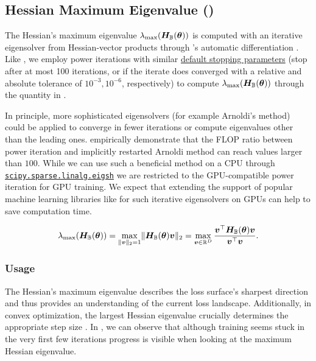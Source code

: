 \subsection{Hessian Maximum Eigenvalue
  ()}\label{cockpit::app:max-ev}

The Hessian's maximum eigenvalue $\lambda_{\text{max}}({\bm{H}}_{{\mathbb{B}}}({\bm{\theta}}))$ is
computed with an iterative eigensolver from Hessian-vector products through
\pytorch's automatic differentiation \citep{pearlmutter1994fast}. Like
\citet{yao2020pyhessian}, we employ power iterations with similar
\href{https://github.com/amirgholami/PyHessian/blob/0f7e0f63a0f132998608013351ba19955fc9d861/pyhessian/hessian.py#L111-L158}{default
  stopping parameters} (stop after at most 100 iterations, or if the iterate
does converged with a relative and absolute tolerance of $10^{-3}, 10^{-6}$,
respectively) to compute $\lambda_{\text{max}}({\bm{H}}_{{\mathbb{B}}}({\bm{\theta}}))$ through the
 quantity in \cockpit.

In principle, more sophisticated eigensolvers (for example Arnoldi's method)
could be applied to converge in fewer iterations or compute eigenvalues other
than the leading ones. \citet{warsa2004krylov} empirically demonstrate that the
FLOP ratio between power iteration and implicitly restarted Arnoldi method can
reach values larger than $100$. While we can use such a beneficial method on a
CPU through
\href{https://docs.scipy.org/doc/scipy/reference/generated/scipy.sparse.linalg.eigsh.html} {\texttt{scipy.sparse.linalg.eigsh}}
we are restricted to the GPU-compatible power iteration for GPU training. We
expect that extending the support of popular machine learning libraries like
\pytorch for such iterative eigensolvers on GPUs can help to save computation
time.

\begin{equation}
  \label{cockpit::eq:hess-max-ev-feature-table}
  \lambda_{\text{max}}({\bm{H}}_{{\mathbb{B}}}({\bm{\theta}}))
  =
  \max_{\lVert {\bm{v}} \rVert_2 = 1} \lVert {\bm{H}}_{{\mathbb{B}}}({\bm{\theta}}){\bm{v}} \rVert_2
  =
  \max_{{\bm{v}} \in {\mathbb{R}}^D} \frac{{\bm{v}}^\top {\bm{H}}_{{\mathbb{B}}}({\bm{\theta}}) {\bm{v}}}{{\bm{v}}^\top {\bm{v}}}.
\end{equation}

\subsubsection{Usage}

The Hessian's maximum eigenvalue describes the loss surface's sharpest direction
and thus provides an understanding of the current loss landscape. Additionally,
in convex optimization, the largest Hessian eigenvalue crucially determines the
appropriate step size \citep{schmidt2014convergence}. In
, we can observe that although training seems stuck
in the very first few iterations progress is visible when looking at the maximum
Hessian eigenvalue.


